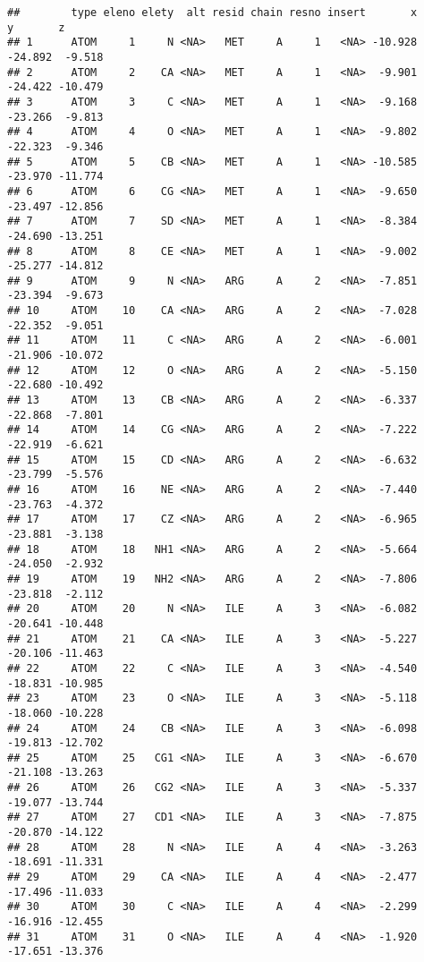 \documentclass[
]{article}
\begin{document}
\begin{verbatim}
##        type eleno elety  alt resid chain resno insert       x       y       z
## 1      ATOM     1     N <NA>   MET     A     1   <NA> -10.928 -24.892  -9.518
## 2      ATOM     2    CA <NA>   MET     A     1   <NA>  -9.901 -24.422 -10.479
## 3      ATOM     3     C <NA>   MET     A     1   <NA>  -9.168 -23.266  -9.813
## 4      ATOM     4     O <NA>   MET     A     1   <NA>  -9.802 -22.323  -9.346
## 5      ATOM     5    CB <NA>   MET     A     1   <NA> -10.585 -23.970 -11.774
## 6      ATOM     6    CG <NA>   MET     A     1   <NA>  -9.650 -23.497 -12.856
## 7      ATOM     7    SD <NA>   MET     A     1   <NA>  -8.384 -24.690 -13.251
## 8      ATOM     8    CE <NA>   MET     A     1   <NA>  -9.002 -25.277 -14.812
## 9      ATOM     9     N <NA>   ARG     A     2   <NA>  -7.851 -23.394  -9.673
## 10     ATOM    10    CA <NA>   ARG     A     2   <NA>  -7.028 -22.352  -9.051
## 11     ATOM    11     C <NA>   ARG     A     2   <NA>  -6.001 -21.906 -10.072
## 12     ATOM    12     O <NA>   ARG     A     2   <NA>  -5.150 -22.680 -10.492
## 13     ATOM    13    CB <NA>   ARG     A     2   <NA>  -6.337 -22.868  -7.801
## 14     ATOM    14    CG <NA>   ARG     A     2   <NA>  -7.222 -22.919  -6.621
## 15     ATOM    15    CD <NA>   ARG     A     2   <NA>  -6.632 -23.799  -5.576
## 16     ATOM    16    NE <NA>   ARG     A     2   <NA>  -7.440 -23.763  -4.372
## 17     ATOM    17    CZ <NA>   ARG     A     2   <NA>  -6.965 -23.881  -3.138
## 18     ATOM    18   NH1 <NA>   ARG     A     2   <NA>  -5.664 -24.050  -2.932
## 19     ATOM    19   NH2 <NA>   ARG     A     2   <NA>  -7.806 -23.818  -2.112
## 20     ATOM    20     N <NA>   ILE     A     3   <NA>  -6.082 -20.641 -10.448
## 21     ATOM    21    CA <NA>   ILE     A     3   <NA>  -5.227 -20.106 -11.463
## 22     ATOM    22     C <NA>   ILE     A     3   <NA>  -4.540 -18.831 -10.985
## 23     ATOM    23     O <NA>   ILE     A     3   <NA>  -5.118 -18.060 -10.228
## 24     ATOM    24    CB <NA>   ILE     A     3   <NA>  -6.098 -19.813 -12.702
## 25     ATOM    25   CG1 <NA>   ILE     A     3   <NA>  -6.670 -21.108 -13.263
## 26     ATOM    26   CG2 <NA>   ILE     A     3   <NA>  -5.337 -19.077 -13.744
## 27     ATOM    27   CD1 <NA>   ILE     A     3   <NA>  -7.875 -20.870 -14.122
## 28     ATOM    28     N <NA>   ILE     A     4   <NA>  -3.263 -18.691 -11.331
## 29     ATOM    29    CA <NA>   ILE     A     4   <NA>  -2.477 -17.496 -11.033
## 30     ATOM    30     C <NA>   ILE     A     4   <NA>  -2.299 -16.916 -12.455
## 31     ATOM    31     O <NA>   ILE     A     4   <NA>  -1.920 -17.651 -13.376

\end{verbatim}
\end{document}
